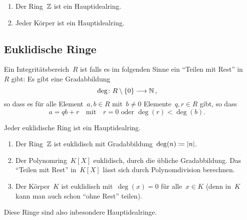 \begin{example}
  \leavevmode
  \begin{enumerate}
    \item
      Der Ring~$\mathbb{Z}$ ist ein Hauptidealring.
    \item
      Jeder Körper ist ein Hauptidealring.
  \end{enumerate}
\end{example}



\subsection{Euklidische Ringe}

\begin{definition}
  Ein Integritätsbereich~$R$ ist  falls es im folgenden Sinne ein \enquote{Teilen mit Rest} in~$R$ gibt:
  Es gibt eine Gradabbildung
  \[
    \deg
    \colon
    R \setminus \{ 0 \}
    \to
    \Natural \,,
  \]
  so dass es für alle Element~$a, b \in R$ mit~$b \neq 0$ Elemente~$q, r \in R$ gibt, so dass~
  \[
    a = qb + r
    \quad\text{mit}\quad
    \text{$r = 0$ oder~$\deg(r) < \deg(b)$.}
  \]
\end{definition}

\begin{proposition}
  Jeder euklidische Ring ist ein Hauptidealring.
\end{proposition}

\begin{example}
  \leavevmode
  \begin{enumerate}
    \item
      Der Ring~$\mathbb{Z}$ ist euklidisch mit Gradabbildung~$\deg(n) \coloneqq \lvert n\rvert$.
    \item
      Der Polynomring~$K[X]$ euklidisch, durch die übliche Gradabbildung.
      Das \enquote{Teilen mit Rest} in~$K[X]$ lässt sich durch Polynomdivision berechnen.
    \item
      Der Körper~$K$ ist euklidisch mit~$\deg(x) = 0$ für alle~$x \in K$ (denn in~$K$ kann man auch schon \enquote{ohne Rest} teilen).
  \end{enumerate}
  Diese Ringe sind also inbesondere Hauptidealringe.
\end{example}

